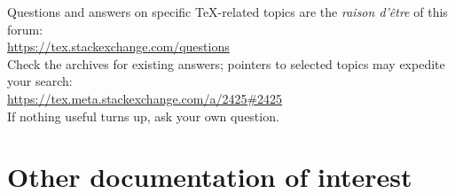 \medskip
Questions and answers on specific \TeX-related topics are the
\emph{raison d'\^etre} of this forum:\\
\null\hspace{2\parindent}
\url{https://tex.stackexchange.com/questions}\\
Check the archives for existing answers; pointers to selected topics
may expedite your search:\\
\null\hspace{2\parindent}
\url{https://tex.meta.stackexchange.com/a/2425#2425}\\
If nothing useful turns up, ask your own question.



\section{Other documentation of interest}

